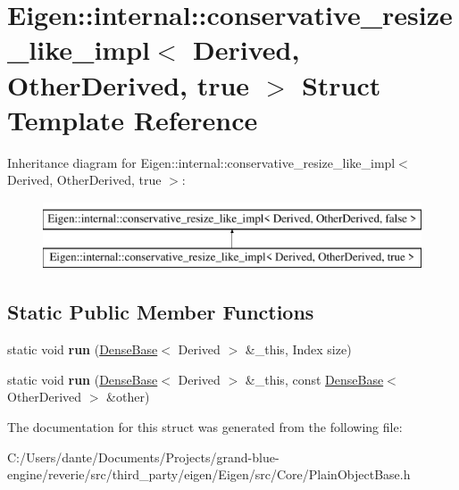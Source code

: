 \hypertarget{struct_eigen_1_1internal_1_1conservative__resize__like__impl_3_01_derived_00_01_other_derived_00_01true_01_4}{}\section{Eigen\+::internal\+::conservative\+\_\+resize\+\_\+like\+\_\+impl$<$ Derived, Other\+Derived, true $>$ Struct Template Reference}
\label{struct_eigen_1_1internal_1_1conservative__resize__like__impl_3_01_derived_00_01_other_derived_00_01true_01_4}
Inheritance diagram for Eigen\+::internal\+::conservative\+\_\+resize\+\_\+like\+\_\+impl$<$ Derived, Other\+Derived, true $>$\+:\begin{figure}[H]
\begin{center}
\leavevmode
\includegraphics[height=2.000000cm]{struct_eigen_1_1internal_1_1conservative__resize__like__impl_3_01_derived_00_01_other_derived_00_01true_01_4}
\end{center}
\end{figure}
\subsection*{Static Public Member Functions}
\begin{DoxyCompactItemize}
\item 
\mbox{\label{struct_eigen_1_1internal_1_1conservative__resize__like__impl_3_01_derived_00_01_other_derived_00_01true_01_4_a24a690bdb05a860ad1c253911e95211b}} 
static void {\bfseries run} (\mbox{\hyperlink{class_eigen_1_1_dense_base}{Dense\+Base}}$<$ Derived $>$ \&\+\_\+this, Index size)
\item 
\mbox{\label{struct_eigen_1_1internal_1_1conservative__resize__like__impl_3_01_derived_00_01_other_derived_00_01true_01_4_a48c16fbc1366547027af95eb5cbfcc01}} 
static void {\bfseries run} (\mbox{\hyperlink{class_eigen_1_1_dense_base}{Dense\+Base}}$<$ Derived $>$ \&\+\_\+this, const \mbox{\hyperlink{class_eigen_1_1_dense_base}{Dense\+Base}}$<$ Other\+Derived $>$ \&other)
\end{DoxyCompactItemize}


The documentation for this struct was generated from the following file\+:\begin{DoxyCompactItemize}
\item 
C\+:/\+Users/dante/\+Documents/\+Projects/grand-\/blue-\/engine/reverie/src/third\+\_\+party/eigen/\+Eigen/src/\+Core/Plain\+Object\+Base.\+h\end{DoxyCompactItemize}
